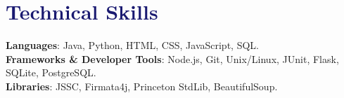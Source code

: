 \documentclass[11pt]{extreport}
\begin{document}
\section{\textcolor{MidnightBlue}{Technical Skills}}
 \begin{itemize}[leftmargin=0.15in, label={}]
    \small{\item{
    \textbf{Languages}{: Java, Python, HTML, CSS, JavaScript, SQL.} \\
     \textbf{Frameworks \& Developer Tools}{: Node.js, Git, Unix/Linux, JUnit, Flask, SQLite, PostgreSQL.} \\
     \textbf{Libraries}{: JSSC, Firmata4j, Princeton StdLib, BeautifulSoup.}
    }}
 \end{itemize}
\end{document}
